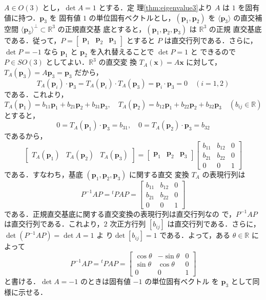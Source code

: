 \documentclass[11pt, uplatex, dvipdfmx, titlepage]{jsarticle}
\makeatletter
\renewenvironment{proof}[1][\proofname]{\par
  \pushQED{\qed}%
  \normalfont \topsep6\p@\@plus6\p@\relax
  \trivlist
  \item[\hskip\labelsep
         \bfseries
    {#1}]\ignorespaces
}{%
  \popQED\endtrivlist\@endpefalse
}
\theoremstyle{definition}
\renewcommand{\proofname}{\textbf{証明}}
\makeatother
\begin{document}
\begin{proof}
  $A \in O(3)$ とし，$\det A=1$ とする．定
  理\ref{thm:eigenvalue3}より $A$ は $1$ を固有値に持つ．$\bm{p}_3$ を
  固有値 $1$ の単位固有ベクトルとし，$(\bm{p}_1,
  \bm{p}_2)$ を $\langle \bm{p}_3 \rangle$ の直交補空間
  $\langle \bm{p}_3 \rangle^{\perp} \subset \mathbb{R}^3$ の正規直交基
  底とすると，$(\bm{p}_1, \bm{p}_2, \bm{p}_3)$ は $\mathbb{R}^3$ の正規
  直交基底である．従って，$P=\left[
    \begin{array}{ccc}
      \bm{p}_1 & \bm{p}_2 & \bm{p}_3
    \end{array}
  \right]$ とすると $P$ は直交行列である．さらに，$\det
  P=-1$ なら $\bm{p}_1$ と $\bm{p}_2$ を入れ替えることで $\det P=1$ と
  できるので $P \in SO(3)$ としてよい．$\mathbb{R}^3$ の直交変
  換 $T_A(\bm{x}) = A\bm{x}$ に対して，$T_A(\bm{p}_3) = A\bm{p}_3=
  \bm{p}_3$ だから，
  \[
    T_A(\bm{p}_i) \cdot \bm{p}_3 = T_A(\bm{p}_i) \cdot T_A(\bm{p}_3) =
    \bm{p}_i \cdot \bm{p}_3 =0 \quad (i=1,2)
  \]
  である．これより，
  \[
    T_A(\bm{p}_1) = b_{11} \bm{p}_1 + b_{21} \bm{p}_2+ b_{31} \bm{p}_3, \quad 
    T_A(\bm{p}_2) = b_{12} \bm{p}_1 + b_{22} \bm{p}_2+ b_{32} \bm{p}_3 \quad (b_{ij} \in \mathbb{R})
  \]
  とすると，
  \[
    0 = T_A(\bm{p}_1)\cdot \bm{p}_3 = b_{31}, \quad 0= T_A(\bm{p}_2) \cdot  \bm{p}_3 = b_{32}
  \]
  であるから，
  \[
    \left[
      \begin{array}{ccc}
        T_A(\bm{p}_1) & T_A(\bm{p}_2) & T_A(\bm{p}_3)
      \end{array}
    \right] = \left[
      \begin{array}{ccc}
        \bm{p}_1 & \bm{p}_2 & \bm{p}_3
      \end{array}
    \right]\left[
      \begin{array}{ccc}
        b_{11} & b_{12} & 0\\
        b_{21} & b_{22} & 0\\
        0 & 0 & 1
      \end{array}
    \right]
  \]
  である．すなわち，基底 $(\bm{p}_1, \bm{p}_2, \bm{p}_3)$ に関する直交
  変換 $T_A$ の表現行列は
  \[
    P^{-1}AP= {}^{t}PAP = \left[
      \begin{array}{ccc}
        b_{11} &  b_{12} & 0\\
        b_{21} & b_{22} & 0\\
        0 & 0 & 1
      \end{array}
    \right]
  \]
  である．正規直交基底に関する直交変換の表現行列は直交行列なの
  で，$P^{-1}AP$ は直交行列である．これより，$2$ 次正方行列 $\left[
    b_{ij} \right]$
  は直交行列である．さらに，$\det \left( P^{-1}AP\right) = \det A=1$ よ
  り$\det \left[ b_{ij}\right] =1$ である．よって，ある $\theta \in
  \mathbb{R}$ によって
  \[
    P^{-1}AP = {}^{t}P AP = \left[
      \begin{array}{ccc}
        \cos \theta & -\sin \theta & 0\\
        \sin \theta & \cos \theta & 0\\
        0 & 0 & 1
      \end{array}
    \right]
  \]
  と書ける．$\det A=-1$ のときは固有値 $-1$ の単位固有ベクトル
  を $\bm{p}_3$ として同様に示せる．
\end{proof}
\end{document}
